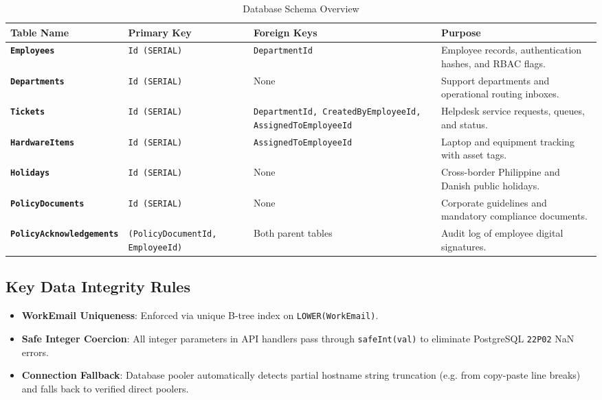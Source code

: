 \documentclass[a4paper,11pt]{article}
\begin{document}
\begin{table}[!ht]
\centering
\small
\begin{tabularx}{\textwidth}{>{\bfseries}p{3.2cm} p{2.8cm} p{3.0cm} X}
\toprule
Table Name & Primary Key & Foreign Keys & Purpose \\
\midrule
\texttt{Employees} & \texttt{Id (SERIAL)} & \texttt{DepartmentId} & Employee records, authentication hashes, and RBAC flags. \\
\addlinespace
\texttt{Departments} & \texttt{Id (SERIAL)} & None & Support departments and operational routing inboxes. \\
\addlinespace
\texttt{Tickets} & \texttt{Id (SERIAL)} & \texttt{DepartmentId, CreatedByEmployeeId, AssignedToEmployeeId} & Helpdesk service requests, queues, and status. \\
\addlinespace
\texttt{HardwareItems} & \texttt{Id (SERIAL)} & \texttt{AssignedToEmployeeId} & Laptop and equipment tracking with asset tags. \\
\addlinespace
\texttt{Holidays} & \texttt{Id (SERIAL)} & None & Cross-border Philippine and Danish public holidays. \\
\addlinespace
\texttt{PolicyDocuments} & \texttt{Id (SERIAL)} & None & Corporate guidelines and mandatory compliance documents. \\
\addlinespace
\texttt{PolicyAcknowledgements} & \texttt{(PolicyDocumentId, EmployeeId)} & Both parent tables & Audit log of employee digital signatures. \\
\bottomrule
\end{tabularx}
\caption{Database Schema Overview}
\end{table}

\subsection{Key Data Integrity Rules}
\begin{itemize}
    \item \textbf{WorkEmail Uniqueness}: Enforced via unique B-tree index on \texttt{LOWER(WorkEmail)}.
    \item \textbf{Safe Integer Coercion}: All integer parameters in API handlers pass through \texttt{safeInt(val)} to eliminate PostgreSQL \texttt{22P02} NaN errors.
    \item \textbf{Connection Fallback}: Database pooler automatically detects partial hostname string truncation (e.g. from copy-paste line breaks) and falls back to verified direct poolers.
\end{itemize}
\end{document}
